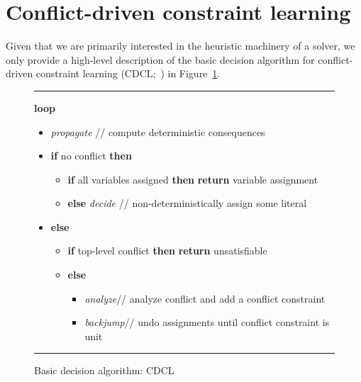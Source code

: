 
\section{Conflict-driven constraint learning}\label{sec:cdcl}

Given that we are primarily interested in the heuristic machinery of a solver,
we only provide a high-level description of the basic decision algorithm for 
conflict-driven constraint learning (CDCL;~\cite{marsak99a,zamamoma01a})
in Figure~\ref{algo:cdcl}.
%
\begin{figure}[t]
\newcommand{\ITEMHACK}{\itemindent=-5pt\itemsep=0pt\parsep=\itemsep}
\small
\hrule\vspace{2pt}
\noindent\textbf{loop}\\[-12pt]
  \begin{itemize}\ITEMHACK
  \item [] \textit{propagate}  
    \hfill// compute deterministic consequences
  \item [] \textbf{if} no conflict \textbf{then}
    \begin{itemize}\ITEMHACK
    \item [] \textbf{if} all variables assigned 
      \textbf{then} 
      \textbf{return} variable assignment
    \item [] \textbf{else}
      \textit{decide} 
      \hfill// non-deterministically assign some literal
    \end{itemize}
  \item [] \textbf{else} 
    \begin{itemize}\ITEMHACK
    \item [] \textbf{if} top-level conflict %
      \textbf{then} 
      \textbf{return} unsatisfiable
    \item [] \textbf{else}
      \begin{itemize}\ITEMHACK
      \item [] \textit{analyze}\hfill// analyze conflict and add a conflict constraint
      \item [] \textit{backjump}\hfill// undo assignments until conflict constraint is unit
      \end{itemize}
    \end{itemize}
  \end{itemize}
  \hrule  
  \caption{Basic decision algorithm: CDCL}
  \label{algo:cdcl}
\end{figure}
